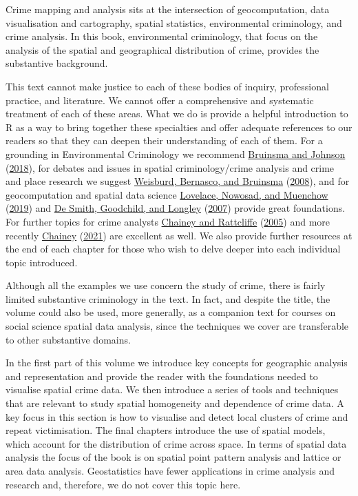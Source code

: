 \documentclass[
  krantz2]{krantz}
\begin{document}
Crime mapping and analysis sits at the intersection of geocomputation, data visualisation and cartography, spatial statistics, environmental criminology, and crime analysis. In this book, environmental criminology, that focus on the analysis of the spatial and geographical distribution of crime, provides the substantive background.

This text cannot make justice to each of these bodies of inquiry, professional practice, and literature. We cannot offer a comprehensive and systematic treatment of each of these areas. What we do is provide a helpful introduction to R as a way to bring together these specialties and offer adequate references to our readers so that they can deepen their understanding of each of them. For a grounding in Environmental Criminology we recommend \protect\hyperlink{ref-Bruinsma_2018}{Bruinsma and Johnson} (\protect\hyperlink{ref-Bruinsma_2018}{2018}), for debates and issues in spatial criminology/crime analysis and crime and place research we suggest \protect\hyperlink{ref-Weisburd_2008}{Weisburd, Bernasco, and Bruinsma} (\protect\hyperlink{ref-Weisburd_2008}{2008}), and for geocomputation and spatial data science \protect\hyperlink{ref-Lovelace_2019}{Lovelace, Nowosad, and Muenchow} (\protect\hyperlink{ref-Lovelace_2019}{2019}) and \protect\hyperlink{ref-DeSmith_2007}{De Smith, Goodchild, and Longley} (\protect\hyperlink{ref-DeSmith_2007}{2007}) provide great foundations. For further topics for crime analysts \protect\hyperlink{ref-Chainey_2005}{Chainey and Rattcliffe} (\protect\hyperlink{ref-Chainey_2005}{2005}) and more recently \protect\hyperlink{ref-Chainey_2021}{Chainey} (\protect\hyperlink{ref-Chainey_2021}{2021}) are excellent as well. We also provide further resources at the end of each chapter for those who wish to delve deeper into each individual topic introduced.

Although all the examples we use concern the study of crime, there is fairly limited substantive criminology in the text. In fact, and despite the title, the volume could also be used, more generally, as a companion text for courses on social science spatial data analysis, since the techniques we cover are transferable to other substantive domains.

In the first part of this volume we introduce key concepts for geographic analysis and representation and provide the reader with the foundations needed to visualise spatial crime data. We then introduce a series of tools and techniques that are relevant to study spatial homogeneity and dependence of crime data. A key focus in this section is how to visualise and detect local clusters of crime and repeat victimisation. The final chapters introduce the use of spatial models, which account for the distribution of crime across space. In terms of spatial data analysis the focus of the book is on spatial point pattern analysis and lattice or area data analysis. Geostatistics have fewer applications in crime analysis and research and, therefore, we do not cover this topic here.
\end{document}
